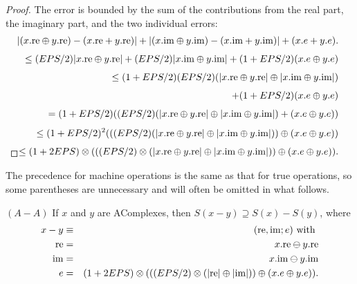 \begin{proof}{}
The error is bounded by the sum of the contributions from the real part, the imaginary part, and the two individual errors:
\begin{eqnarray*}
 & &\hskip-20pt |(x.\mathrm {re} \oplus y.\mathrm {re}) -(x.\mathrm {re} + y.\mathrm {re})| + |(x.\mathrm {im} \oplus y.\mathrm {im}) -
(x.\mathrm {im} + y.\mathrm {im})| + (x.e + y.e).\\[4pt]
&&\hskip-12pt \le (EPS/2) |x.\mathrm {re} \oplus y.\mathrm {re}| + (EPS/2) |x.\mathrm {im} \oplus y.\mathrm {im}| + 
(1 + EPS/2) (x.e \oplus y.e)\\[4pt]
&&\hskip-12pt \le  (1 + EPS/2) (EPS/2)(|x.\mathrm {re} \oplus y.\mathrm {re}| \oplus 
 |x.\mathrm {im} \oplus y.\mathrm {im}| ) \\[4pt]
&&\hskip-12pt \qquad + (1 + EPS/2) (x.e \oplus y.e)\\[4pt]
&&\hskip-12pt = (1 + EPS/2) ((EPS/2)(|x.\mathrm {re} \oplus y.\mathrm {re}| \oplus 
 |x.\mathrm {im} \oplus y.\mathrm {im}| ) + (x.e \oplus y.e))\\[4pt]
&&\hskip-12pt \le (1 + EPS/2)^2 (((EPS/2) (|x.\mathrm {re} \oplus y.\mathrm {re}| \oplus 
 |x.\mathrm {im} \oplus y.\mathrm {im}| )) \oplus  (x.e \oplus y.e))\\[4pt]
&&\hskip-12pt \le   (1 + 2 EPS) \otimes (((EPS/2)\otimes (|x.\mathrm {re} \oplus
y.\mathrm {re}| \oplus |x.\mathrm {im} \oplus y.\mathrm {im}| )) \oplus (x.e \oplus y.e)).\\[4pt]
\noalign{\vskip-24pt}
\end{eqnarray*}
\end{proof}

The precedence for machine operations is the same as that for true operations, so some  parentheses are unnecessary
and will often be omitted in what
 follows.

\begin{proposition}\label{GMT prop7.7}{$(A - A)$}
If $x$ and $y$ are {\textrm AComplexes,} then 
$S(x - y) \supseteq S(x) - S(y)${\textrm ,} where
\begin{eqnarray*}
x-y &\equiv& (\mathrm {re},\mathrm {im};e) \hbox{ with }\\
\mathrm {re}& =& x.\mathrm {re} \ominus y.\mathrm {re}\\
\mathrm {im}& =& x.\mathrm {im} \ominus y.\mathrm {im}\\
e &=& (1 + 2 EPS) \otimes ( ((EPS/2) \otimes (|\mathrm {re}| \oplus |\mathrm {im}|))
 \oplus (x.e \oplus y.e)).
\end{eqnarray*}
\end{proposition}


